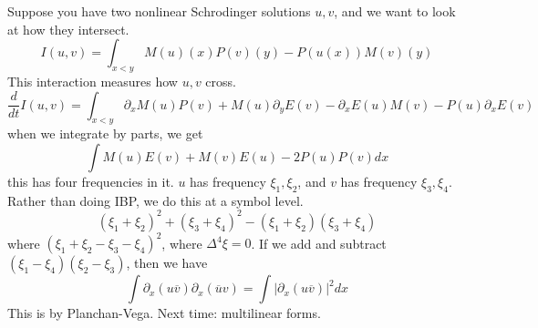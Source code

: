 Suppose you have two nonlinear Schrodinger solutions $u,v$, and we want to look at how they intersect.
\begin{equation*}
    I(u,v)=\int_{x<y}M(u)(x)P(v)(y)-P(u(x))M(v)(y)
\end{equation*}
This interaction measures how $u,v$ cross.
\begin{equation*}
    \frac{d}{dt}I(u,v)=\int_{x<y}\partial_xM(u)P(v)+M(u)\partial_yE(v)-\partial_xE(u)M(v)-P(u)\partial_xE(v)
\end{equation*}
when we integrate by parts, we get 
\begin{equation*}
    \int M(u)E(v)+M(v)E(u)-2P(u)P(v)dx
\end{equation*}
this has four frequencies in it. $u$ has frequency $\xi_1, \xi_2$, and $v$ has frequency $\xi_3, \xi_4$. Rather than doing IBP, we do this at a symbol level.
\begin{equation*}
    (\xi_1+\xi_2)^2+(\xi_3+\xi_4)^2-(\xi_1+\xi_2)(\xi_3+\xi_4)
\end{equation*}
where $(\xi_1+\xi_2-\xi_3-\xi_4)^2$, where $\Delta^4\xi=0$. If we add and subtract $(\xi_1-\xi_4)(\xi_2-\xi_3)$, then we have 
\begin{equation*}
    \int \partial_x(u\overline{v})\partial_x(\overline{u}v)=\int|\partial_x(u\overline{v})|^2dx
\end{equation*}
This is by Planchan-Vega. Next time: multilinear forms.
